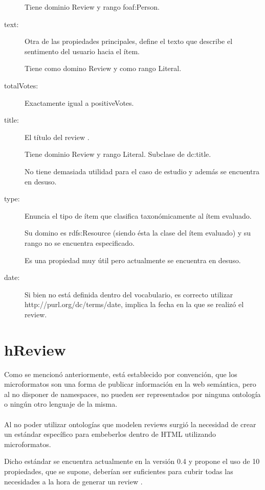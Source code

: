 \begin{description}
  Tiene dominio Review y rango foaf:Person. 
  \item [text:] Otra de las propiedades principales, define el texto que describe el sentimento del usuario hacia el ítem. 
  
  Tiene como domino Review y como rango Literal.
  \item [totalVotes:] Exactamente igual a positiveVotes.
  \item [title:] El título del review . 
  
  Tiene dominio Review y rango Literal. Subclase de dc:title. 
  
  No tiene demasiada utilidad para el caso de estudio y además se encuentra en desuso.
  \item [type:] Enuncia el tipo de ítem que clasifica taxonómicamente al ítem evaluado. 
  
  Su domino es rdfs:Resource (siendo ésta la clase del ítem evaluado) y su rango no se encuentra especificado. 
  
  Es una propiedad muy útil pero actualmente se encuentra en desuso.
  \item [date:] Si bien no está definida dentro del vocabulario, es correcto utilizar \\\noindent http://purl.org/dc/terms/date, implica la fecha
  en la que se realizó el review.
\end{description}

\section{hReview}
\label{section:hreview}

Como se mencionó anteriormente, está establecido por convención, que los microformatos son una forma de publicar información en la 
web semántica, pero al no disponer de namespaces, no pueden ser representados por ninguna ontología o ningún otro lenguaje de la misma. 
\\\\
Al no poder utilizar ontologías que modelen reviews surgió la necesidad de crear un estándar específico para embeberlos dentro de HTML 
utilizando microformatos.

Dicho estándar se encuentra actualmente en la versión 0.4 \cite{Celik} y propone el uso de 10 propiedades, que se supone, deberían ser 
suficientes para cubrir todas las necesidades a la hora de generar un review .

